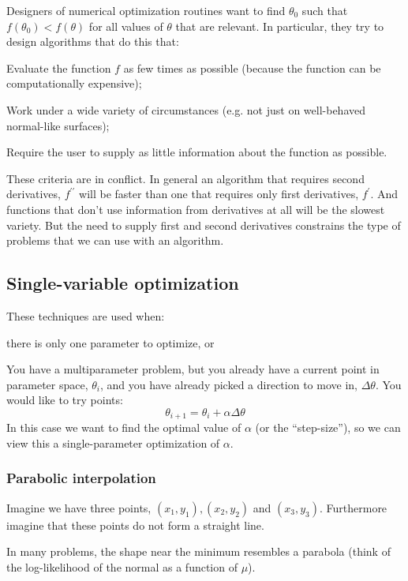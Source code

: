 \documentclass[11pt]{article}
\begin{document}
Designers of numerical optimization routines want to find $\theta_0$ such that $f(\theta_0) < f(\theta)$ for all values of $\theta$ that are relevant.
In particular, they try to design algorithms that do this that:
\begin{compactenum}
	\item Evaluate the function $f$ as few times as possible (because the function can be computationally expensive);
	\item Work under a wide variety of circumstances (e.g. not just on well-behaved normal-like surfaces);
	\item Require the user to supply as little information about the function as possible.
\end{compactenum}
These criteria are in conflict. In general an algorithm that requires second derivatives, $f^{\prime\prime}$ will be faster than one that requires only first derivatives, $f^{\prime}$.
And functions that don't use information from derivatives at all will be the slowest variety.
But the need to supply first and second derivatives constrains the type of problems that we can use with an algorithm.

\subsection*{Single-variable optimization}
These techniques are used when:
\begin{compactenum}
	\item there is only one parameter to optimize, or
	\item You have a multiparameter problem, but you already have a current point in parameter space, $\theta_i$, and you have already picked a direction to move in, $\Delta\theta$. You would like to try points:
		$$\theta_{i+1} = \theta_i + \alpha\Delta\theta $$
	In this case we want to find the optimal value of $\alpha$ (or the ``step-size''), so we can view this a single-parameter optimization of $\alpha$.
\end{compactenum}

\subsubsection*{Parabolic interpolation}
Imagine we have three points, $(x_1, y_1), (x_2, y_2)$ and $(x_3, y_3).$
Furthermore imagine that these points do not form a straight line.

In many problems, the shape near the minimum resembles a parabola (think of the log-likelihood of the normal as a function of $\mu$).
\end{document}
